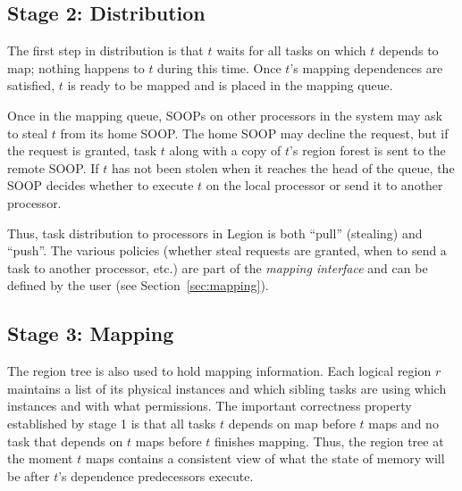 \subsection{Stage 2: Distribution}
\label{sec:dist}

The first step in distribution is that $t$ waits for all tasks on which $t$ depends to
map; nothing happens to $t$ during this time.  Once $t$'s mapping
dependences are satisfied, $t$ is ready to be mapped and is placed
in the mapping queue.

Once in the mapping queue, SOOPs on other processors in the system may
ask to steal $t$ from its home SOOP.  The home SOOP may decline the
request, but if the request is granted, task $t$ along with a copy of
$t$'s region forest is sent to the remote SOOP.  If $t$ has not been
stolen when it reaches the head of the queue, the SOOP decides whether
to execute $t$ on the local processor or send it to another processor.

Thus, task distribution to processors in Legion is both ``pull'' (stealing) and ``push''.
The various policies (whether steal requests are granted, when to send
a task to another processor, etc.) are part of the {\em mapping interface}
and can be defined by the user (see Section~\ref{sec:mapping}).


\subsection{Stage 3: Mapping}
\label{sec:map}


The region tree is also used to hold mapping information.  Each logical region $r$ maintains a
list of its physical instances and which sibling tasks are using which
instances and with what permissions.  The important correctness
property established by stage 1 is that all
tasks $t$ depends on map before $t$ maps and no task that depends on
$t$ maps before $t$ finishes mapping.  Thus, the region tree at the
moment $t$ maps contains a consistent view of what the state of memory
will be after $t$'s dependence predecessors execute.

